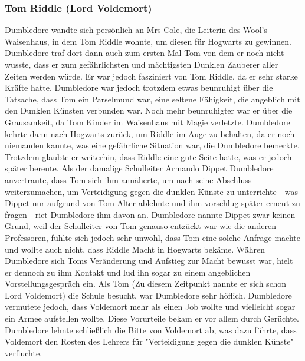 \documentclass[a4paper, 10pt]{article}
\begin{document}
\subsubsection*{\large Tom Riddle (Lord Voldemort)}
Dumbledore wandte sich persönlich an Mrs Cole, die Leiterin des Wool's Waisenhaus, in dem Tom Riddle wohnte, um diesen für Hogwarts zu gewinnen. Dumbledore traf dort dann auch zum ersten Mal Tom von dem er noch nicht wusste, dass er zum gefährlichsten und mächtigsten Dunklen Zauberer aller Zeiten werden würde. Er war jedoch fasziniert von Tom Riddle, da er sehr starke Kräfte hatte. Dumbledore war jedoch trotzdem etwas beunruhigt über die Tatsache, dass Tom ein Parselmund war, eine seltene Fähigkeit, die angeblich mit den Dunklen Künsten verbunden war. Noch mehr beunruhigter war er über die Grausamkeit, da Tom Kinder im Waisenhaus mit Magie verletzte. Dumbledore kehrte dann nach Hogwarts zurück, um Riddle im Auge zu behalten, da er noch niemanden kannte, was eine gefährliche Situation war, die Dumbledore bemerkte. Trotzdem glaubte er weiterhin, dass Riddle eine gute Seite hatte, was er jedoch später bereute.
\vspace{10pt}
\newline
Als der damalige Schulleiter Armando Dippet Dumbledore anvertraute, dass Tom sich ihm annäherte, um nach seine Abschluss weiterzumachen, um Verteidigung gegen die dunklen Künste zu unterrichte - was Dippet nur aufgrund von Tom Alter ablehnte und ihm vorschlug später erneut zu fragen - riet Dumbledore ihm davon an. Dumbledore nannte Dippet zwar keinen Grund, weil der Schulleiter von Tom genauso entzückt war wie die anderen Professoren, fühlte sich jedoch sehr unwohl, dass Tom eine solche Anfrage machte und wollte auch nicht, dass Riddle Macht in Hogwarts bekäme.
\vspace{10pt}
\newline
Währen Dumbledore sich Toms Veränderung und Aufstieg zur Macht bewusst war, hielt er dennoch zu ihm Kontakt und lud ihn sogar zu einem angeblichen Vorstellungsgespräch ein. Als Tom (Zu diesem Zeitpunkt nannte er sich schon Lord Voldemort) die Schule besucht, war Dumbledore sehr höflich. Dumbledore vermutete jedoch, dass Voldemort mehr als einen Job wollte und vielleicht sogar ein Armee aufstellen wollte. Diese Vorurteile bekam er vor allem durch Gerüchte. Dumbledore lehnte schließlich die Bitte von Voldemort ab, was dazu führte, dass Voldemort den Rosten des Lehrers für "Verteidigung gegen die dunklen Künste" verfluchte.
\vspace{10pt}
\newline
\end{document}
